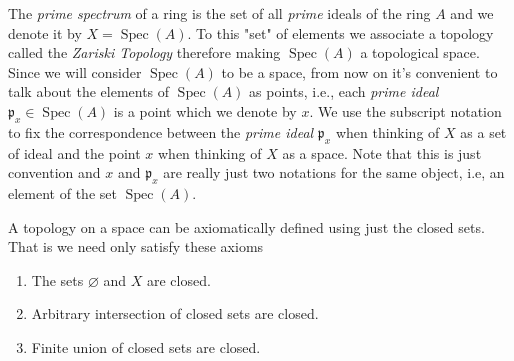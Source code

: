 \documentclass[]{report}
\DeclareMathOperator\Spec{Spec}
\begin{document}
The \textit{prime spectrum} of a ring is the set of all \textit{prime} ideals of the ring $A$ and we denote it by $X = \Spec(A)$. To this "set" of elements we associate a topology called the \textit{Zariski Topology} therefore making $\Spec(A)$ a topological space. Since we will consider $\Spec(A)$ to be a space, from now on it's convenient to talk about the elements of $\Spec(A)$ as points, i.e., each \textit{prime ideal} $\mathfrak{p}_x \in \Spec(A)$ is a point which we denote by $x$. We use the subscript notation to fix the correspondence between the \textit{prime ideal} $\mathfrak{p}_x$ when thinking of $X$ as a set of ideal and the point $x$ when thinking of $X$ as a space. Note that this is just convention and $x$ and $\mathfrak{p}_x$ are really just two notations for the same object, i.e, an element of the set $\Spec(A)$.

A topology on a space can be axiomatically defined using just the closed sets. That is we need only satisfy these axioms
\begin{enumerate}
    \item The sets $\varnothing$ and $X$ are closed. 
    \item Arbitrary intersection of closed sets are closed. 
    \item Finite union of closed sets are closed.
\end{enumerate}
\end{document}
